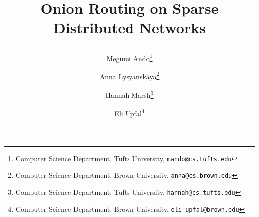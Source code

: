 \newif \iftheory 

\theorytrue %

\newif \ifblind

\blindtrue \blindfalse

\newcommand{\eli}[1]{\textcolor{blue}{[Eli: #1]}}
\newcommand{\meg}[1]{\textcolor{red}{[Megumi: #1]}}
\newcommand{\hannah}[1]{\textcolor{magenta}{[Hannah: #1]}}


\newcommand{\authorlist}{
Megumi Ando\iftheory\thanks{Computer Science Department, Tufts University, {\tt mando@cs.tufts.edu}}\fi
\and 
Anna Lysyanskaya\iftheory\thanks{Computer Science Department, Brown University, {\tt anna@cs.brown.edu}}\fi
\and 
Hannah Marsh\iftheory\thanks{Computer Science Department, Tufts University, {\tt hannah@cs.tufts.edu}}\fi
\and
Eli Upfal\iftheory\thanks{Computer Science Department, Brown University, {\tt eli\_upfal@brown.edu}}\fi
}

\newcommand{\institutelist}{}


\newcommand{\titlelist}{\iftheory\begin{bf}\fi
Onion Routing on Sparse Distributed Networks
\iftheory\end{bf}\fi}

\newcommand{\pathstyles}{./stylefiles}

\newcommand{\pathpreambles}{./preambles}

\newcommand{\pathbibs}{./bibfiles}



\iftheory
\documentclass[11pt]{article}

\else
\documentclass[runningheads,a4paper]{llncs}
\ifblind 
\institute{}
\else
\institute{\institutelist}
\fi
\fi

\ifblind 
\author{}
\else
\author{\authorlist} 
\fi
\pagestyle{plain}

\title{\titlelist}






\maketitle
\iftheory
\thispagestyle{empty}
\fi

